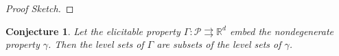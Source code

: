 \documentclass[12pt]{article}
\newcommand{\reals}{\mathbb{R}}
\renewcommand{\P}{\mathcal{P}}
\newcommand{\R}{\mathcal{R}}
\newcommand{\inter}[1]{\mathring{#1}}%
\newcommand{\toto}{\rightrightarrows}
\newcommand{\trim}{\mathrm{trim}}
\newcommand{\strip}{\mathrm{strip}}
\newtheorem{conjecture}{Conjecture}
\begin{document}
\begin{proof}[Proof Sketch]
%		
%		
%		
%		
%		
	
\end{proof}


\begin{conjecture}\label{conj:lev-sets-subsets}
	Let the elicitable property $\Gamma: \P \toto \reals^d$ embed the nondegenerate property $\gamma$.
	Then the level sets of $\Gamma$ are subsets of the level sets of $\gamma$.
\end{conjecture}
\end{document}
